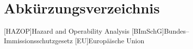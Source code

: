 \chapter*{Abk\"urzungsverzeichnis}
\begin{acronym}[BImSchG] %
	[HAZOP]{Hazard and Operability Analysis}
	[BImSchG]{Bundes--Immissionsschutzgesetz}
	[EU]{Europ\"aische Union}
\end{acronym}